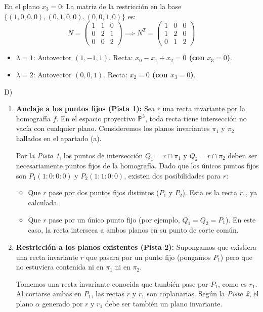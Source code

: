 {En el plano $x_3=0$:
La matriz de la restricción en la base $\{(1,0,0,0), (0,1,0,0), (0,0,1,0)\}$ es:
\[ N = \begin{pmatrix} 1 & 1 & 0 \\ 0 & 2 & 1 \\ 0 & 0 & 2 \end{pmatrix} \implies N^T = \begin{pmatrix} 1 & 0 & 0 \\ 1 & 2 & 0 \\ 0 & 1 & 2 \end{pmatrix} \]
\begin{itemize}
    \item $\lambda=1$: Autovector $(1,-1,1)$. Recta: \textbf{$x_0 - x_1 + x_2 = 0$ (con $x_3=0$)}.
    \item $\lambda=2$: Autovector $(0,0,1)$. Recta: \textbf{$x_2 = 0$ (con $x_3=0$)}.
\end{itemize}
D)
\begin{enumerate}
    \item \textbf{Anclaje a los puntos fijos (Pista 1):} 
    Sea $r$ una recta invariante por la homografía $f$. En el espacio proyectivo $\mathbb{P}^3$, toda recta tiene intersección no vacía con cualquier plano. Consideremos los planos invariantes $\pi_1$ y $\pi_2$ hallados en el apartado (a).
    
    Por la \textit{Pista 1}, los puntos de intersección $Q_1 = r \cap \pi_1$ y $Q_2 = r \cap \pi_2$ deben ser necesariamente puntos fijos de la homografía. Dado que los únicos puntos fijos son $P_1(1:0:0:0)$ y $P_2(1:1:0:0)$, existen dos posibilidades para $r$:
    \begin{itemize}
        \item Que $r$ pase por dos puntos fijos distintos ($P_1$ y $P_2$). Esta es la recta $r_1$, ya calculada.
        \item Que $r$ pase por un único punto fijo (por ejemplo, $Q_1 = Q_2 = P_1$). En este caso, la recta interseca a ambos planos en su punto de corte común.
    \end{itemize}

    \item \textbf{Restricción a los planos existentes (Pista 2):}
    Supongamos que existiera una recta invariante $r$ que pasara por un punto fijo (pongamos $P_1$) pero que no estuviera contenida ni en $\pi_1$ ni en $\pi_2$.
    
    Tomemos una recta invariante conocida que también pase por $P_1$, como es $r_1$. Al cortarse ambas en $P_1$, las rectas $r$ y $r_1$ son coplanarias. Según la \textit{Pista 2}, el plano $\alpha$ generado por $r$ y $r_1$ debe ser también un plano invariante.
    

\end{enumerate}}

